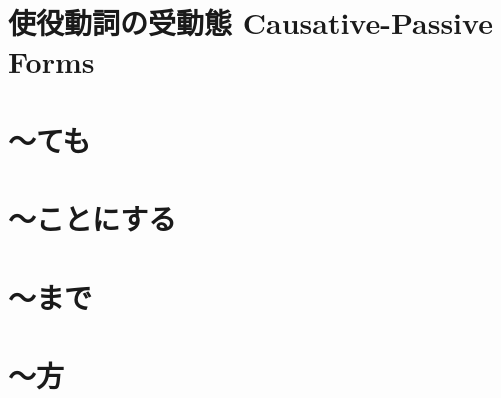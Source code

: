 \documentclass[notoc,notitlepage]{tufte-book}
\begin{document}

\section{使役動詞の受動態 Causative-Passive Forms}%
\label{sec:shiekidoushi_no_jyudoudai_causative_passive_forms}




\section{〜ても}%
\label{sec:temo}




\section{〜ことにする}%
\label{sec:kotonisuru}




\section{〜まで}%
\label{sec:made}




\section{〜方}%
\label{sec:kata}





\appendix

\backmatter

\fancyhead[LE]{\thepage \enspace \textsl{\leftmark}}



\printindex
\end{document}
